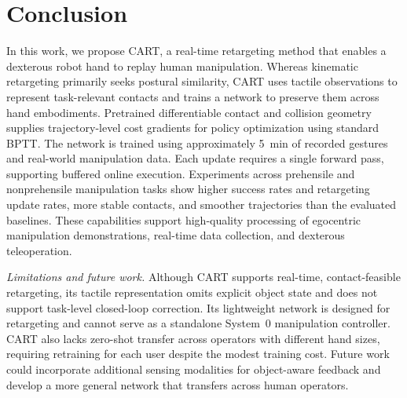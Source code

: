 \section{Conclusion}
\label{sec:conclusion}

In this work, we propose CART, a real-time retargeting method that enables a dexterous robot hand to replay human manipulation. Whereas kinematic retargeting primarily seeks postural similarity, CART uses tactile observations to represent task-relevant contacts and trains a network to preserve them across hand embodiments. Pretrained differentiable contact and collision geometry supplies trajectory-level cost gradients for policy optimization using standard BPTT. The network is trained using approximately 5~min of recorded gestures and real-world manipulation data. Each update requires a single forward pass, supporting buffered online execution. Experiments across prehensile and nonprehensile manipulation tasks show higher success rates and retargeting update rates, more stable contacts, and smoother trajectories than the evaluated baselines. These capabilities support high-quality processing of egocentric manipulation demonstrations, real-time data collection, and dexterous teleoperation.

\begin{samepage}
\textit{Limitations and future work.} Although CART supports real-time, contact-feasible retargeting, its tactile representation omits explicit object state and does not support task-level closed-loop correction. Its lightweight network is designed for retargeting and cannot serve as a standalone System~0 manipulation controller. CART also lacks zero-shot transfer across operators with different hand sizes, requiring retraining for each user despite the modest training cost. Future work could incorporate additional sensing modalities for object-aware feedback and develop a more general network that transfers across human operators.

\end{samepage}
